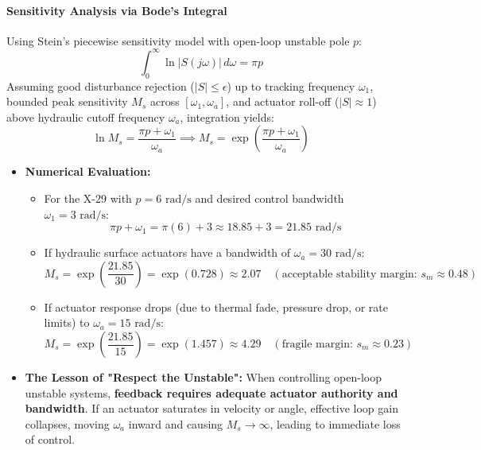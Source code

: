 \documentclass[12pt,onecolumn,twoside ]{article}
\begin{document}
	\paragraph{Sensitivity Analysis via Bode's Integral}
	Using Stein's piecewise sensitivity model with open-loop unstable pole $p$: \[
	\int_{0}^{\infty} \ln |S(j\omega)|\, d\omega = \pi p \quad
	\] Assuming good disturbance rejection ($|S| \le \epsilon$) up to tracking frequency $\omega_1$, bounded peak sensitivity $M_s$ across $[\omega_1, \omega_a]$, and actuator roll-off ($|S| \approx 1$) above hydraulic cutoff frequency $\omega_a$, integration yields: \[
	\ln M_s = \frac{\pi p + \omega_1}{\omega_a} \implies M_s = \exp\left( \frac{\pi p + \omega_1}{\omega_a} \right) \quad
	\]
	\begin{itemize}
		\item
		\textbf{Numerical Evaluation:}
		\begin{itemize}
			\item
			For the X-29 with $p = 6\text{ rad/s}$ and desired control bandwidth $\omega_1 = 3\text{ rad/s}$: \[
			\pi p + \omega_1 = \pi(6) + 3 \approx 18.85 + 3 = 21.85\text{ rad/s}
			\]
			\item
			If hydraulic surface actuators have a bandwidth of $\omega_a = 30\text{ rad/s}$: \[
			M_s = \exp\left( \frac{21.85}{30} \right) = \exp(0.728) \approx 2.07 \quad (\text{acceptable stability margin: } s_m \approx 0.48)
			\]
			\item
			If actuator response drops (due to thermal fade, pressure drop, or rate limits) to $\omega_a = 15\text{ rad/s}$: \[
			M_s = \exp\left( \frac{21.85}{15} \right) = \exp(1.457) \approx 4.29 \quad (\text{fragile margin: } s_m \approx 0.23)
			\]
		\end{itemize}
		\item
		\textbf{The Lesson of "Respect the Unstable":} When controlling open-loop unstable systems, \textbf{feedback requires adequate actuator authority and bandwidth}. If an actuator saturates in velocity or angle, effective loop gain collapses, moving $\omega_a$ inward and causing $M_s \to \infty$, leading to immediate loss of control.
	\end{itemize}
	
\end{document}
